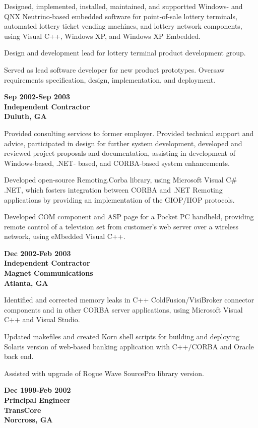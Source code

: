 Designed, implemented, installed, maintained, and supportted Windows-
and QNX Neutrino-based embedded software for point-of-sale lottery
terminals, automated lottery ticket vending machines, and lottery
network components, using Visual C++, Windows XP, and Windows XP
Embedded.

Design and development lead for lottery terminal product development
group.

Served as lead software developer for new product prototypes. Oversaw
requirements specification, design, implementation, and deployment.

\textbf{Sep 2002-Sep 2003\\
Independent Contractor\\
Duluth, GA}

Provided consulting services to former employer. Provided technical
support and advice, participated in design for further system
development, developed and reviewed project proposals and documentation,
assisting in development of Windows-based, .NET- based, and CORBA-based
system enhancements.

Developed open-source Remoting.Corba library, using Microsoft Visual C\#
.NET, which fosters integration between CORBA and .NET Remoting
applications by providing an implementation of the GIOP/IIOP protocols.

Developed COM component and ASP page for a Pocket PC handheld, providing
remote control of a television set from customer's web server over a
wireless network, using eMbedded Visual C++.

\textbf{Dec 2002-Feb 2003\\
Independent Contractor\\
Magnet Communications\\
Atlanta, GA}

Identified and corrected memory leaks in C++ ColdFusion/VisiBroker
connector components and in other CORBA server applications, using
Microsoft Visual C++ and Visual Studio.

Updated makefiles and created Korn shell scripts for building and
deploying Solaris version of web-based banking application with
C++/CORBA and Oracle back end.

Assisted with upgrade of Rogue Wave SourcePro library version.

\textbf{Dec 1999-Feb 2002\\
Principal Engineer\\
TransCore\\
Norcross, GA}

